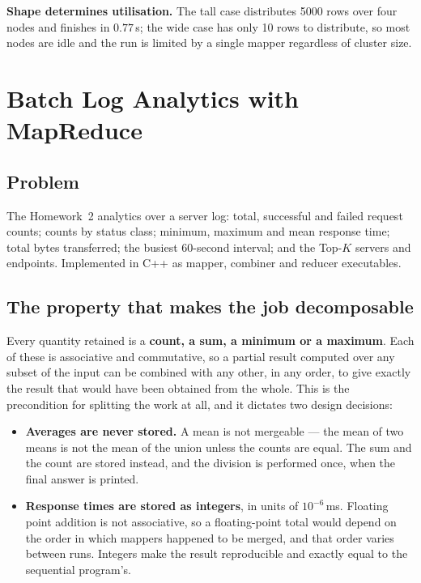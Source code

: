 \documentclass[11pt,a4paper]{article}
\begin{document}
\textbf{Shape determines utilisation.} The tall case distributes 5000 rows over four
nodes and finishes in $0.77$\,s; the wide case has only 10 rows to distribute, so most
nodes are idle and the run is limited by a single mapper regardless of cluster size.

\section{Batch Log Analytics with MapReduce}

\subsection{Problem}
The Homework~2 analytics over a server log: total, successful and failed request counts;
counts by status class; minimum, maximum and mean response time; total bytes
transferred; the busiest 60-second interval; and the Top-$K$ servers and endpoints.
Implemented in C++ as mapper, combiner and reducer executables.

\subsection{The property that makes the job decomposable}
Every quantity retained is a \textbf{count, a sum, a minimum or a maximum}. Each of
these is associative and commutative, so a partial result computed over any subset of
the input can be combined with any other, in any order, to give exactly the result that
would have been obtained from the whole. This is the precondition for splitting the work
at all, and it dictates two design decisions:

\begin{itemize}[leftmargin=1.3em,topsep=2pt,itemsep=2pt]
\item \textbf{Averages are never stored.} A mean is not mergeable --- the mean of two
      means is not the mean of the union unless the counts are equal. The sum and the
      count are stored instead, and the division is performed once, when the final
      answer is printed.
\item \textbf{Response times are stored as integers}, in units of $10^{-6}$\,ms. Floating
      point addition is not associative, so a floating-point total would depend on the
      order in which mappers happened to be merged, and that order varies between runs.
      Integers make the result reproducible and exactly equal to the sequential program's.
\end{itemize}
\end{document}
